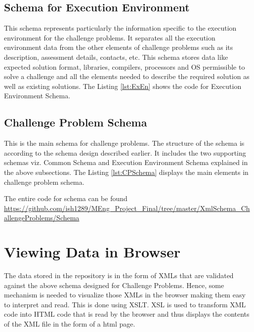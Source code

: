 \documentclass[11pt,letterpaper]{report}
\begin{document}


\subsection{Schema for Execution Environment}
This schema represents particularly the information specific to the execution environment for the challenge problems. It separates all the execution environment data from the other elements of challenge problems such as its description, assessment details, contacts, etc. This schema stores data like expected solution format, libraries, compilers, processors and OS permissible to solve a challenge and  all the elements needed to describe the required solution as well as existing solutions. The Listing \ref{lst:ExEn} shows the code for Execution Environment Schema.



\subsection{Challenge Problem Schema}
This is the main schema for challenge problems. The structure of the schema is according to the schema design described earlier. It includes the two supporting schemas viz. Common Schema and Execution Environment Schema explained in the above subsections. The Listing \ref{lst:CPSchema} displays the main elements in challenge problem schema.

The entire code for schema can be found \url{https://github.com/ish1289/MEng_Project_Final/tree/master/XmlSchema_ChallengeProblems/Schema
}



\section{Viewing Data in Browser}
The data stored in the repository is in the form of XMLs that are validated against the above schema designed for Challenge Problems. Hence, some mechanism is needed to visualize those XMLs in the browser making them easy to interpret and read. This is done using XSLT. XSL is used to transform XML code into HTML code that is read by the browser and thus displays the contents of the XML file in the form of a html page. 
\end{document}
